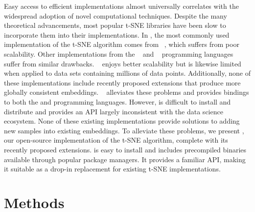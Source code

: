 \documentclass[article]{jss}
\newcommand{\opentsne}{\pkg{openTSNE}\xspace}
\begin{document}
Easy access to efficient implementations almost universally correlates with the widespread adoption of novel computational techniques. Despite the many theoretical advancements, most popular t-SNE libraries have been slow to incorporate them into their implementations.
In , the most commonly used implementation of the t-SNE algorithm comes from ~\citep{pedregosa2011scikit}, which suffers from poor scalability. Other implementations from the ~\citep{team2013r,krijthe2015rtsne} and ~\citep{bezanson2017julia,julia_tsne} programming languages suffer from similar drawbacks. ~\citep{Ulyanov2016} enjoys better scalability but is likewise limited when applied to data sets containing millions of data points. Additionally, none of these implementations include recently proposed extensions that produce more globally consistent embeddings. ~\citep{linderman2019fast} alleviates these problems and provides bindings to both the  and  programming languages. However,  is difficult to install and distribute and provides an API largely inconsistent with the  data science ecosystem. None of these existing implementations provide solutions to adding new samples into existing embeddings.
To alleviate these problems, we present \opentsne, our open-source  implementation of the t-SNE algorithm, complete with its recently proposed extensions. \opentsne is easy to install and includes precompiled binaries available through popular  package managers. It provides a familiar API, making it suitable as a drop-in replacement for existing t-SNE implementations.




\section{Methods} \label{sec:methods}
\end{document}

